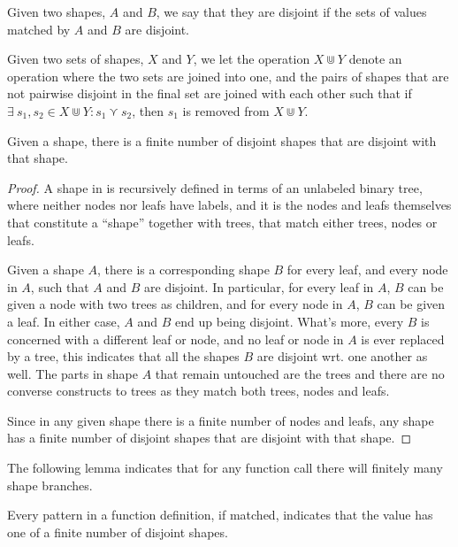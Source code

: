 \begin{definition} Given two shapes, $A$ and $B$, we say that they are disjoint
if the sets of values matched by $A$ and $B$ are disjoint.\end{definition}

\begin{definition} Given two sets of shapes, $X$ and $Y$, we let the operation
$X\Cup Y$ denote an operation where the two sets are joined into one, and the
pairs of shapes that are not pairwise disjoint in the final set are joined with
each other such that if $\exists\ s_1,s_2\in X\Cup Y : s_1\curlyvee s_2$, then
$s_1$ is removed from $X\Cup Y$.  \end{definition}

\begin{lemma}\label{lemma:extend-finite-converse} Given a shape, there is a
finite number of disjoint shapes that are disjoint with that shape.\end{lemma}

\begin{proof} A shape in \D{} is recursively defined in terms of an unlabeled
binary tree, where neither nodes nor leafs have labels, and it is the nodes and
leafs themselves that constitute a ``shape'' together with trees, that match
either trees, nodes or leafs.

Given a shape $A$, there is a corresponding shape $B$ for every leaf, and every
node in $A$, such that $A$ and $B$ are disjoint. In particular, for every leaf
in $A$, $B$ can be given a node with two trees as children, and for every node
in $A$, $B$ can be given a leaf. In either case, $A$ and $B$ end up being
disjoint. What's more, every $B$ is concerned with a different leaf or node,
and no leaf or node in $A$ is ever replaced by a tree, this indicates that all
the shapes $B$ are disjoint wrt. one another as well. The parts in shape $A$
that remain untouched are the trees and there are no converse constructs to trees
as they match both trees, nodes and leafs.

Since in any given shape there is a finite number of nodes and leafs, any shape
has a finite number of disjoint shapes that are disjoint with that shape.
\end{proof}

The following lemma indicates that for any function call there will finitely
many shape branches.

\begin{lemma}\label{lemma:extend-clause-finite} Every pattern in a function
definition, if matched, indicates that the value has one of a finite number of
disjoint shapes.\end{lemma}

